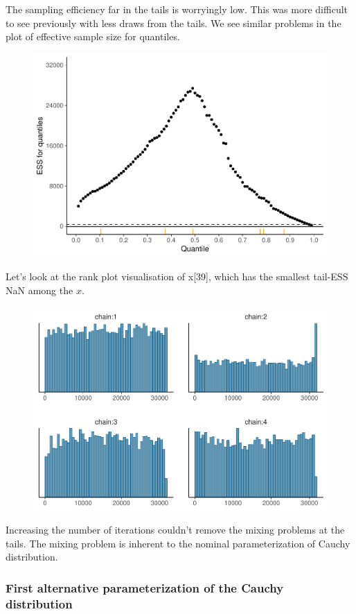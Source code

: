 \documentclass[american,]{article}
\begin{document}
The sampling efficiency far in the tails is worryingly low. This was
more difficult to see previously with less draws from the tails. We see
similar problems in the plot of effective sample size for quantiles.

\begin{figure}[t]
  \centering
  \includegraphics[width=0.6\linewidth]{graphics/quantile-ess-fit-nom-td20l-finer-1.pdf}
\end{figure}

Let's look at the rank plot visualisation of x{[}39{]}, which has the
smallest tail-ESS NaN among the \(x\).

\begin{figure}[t]
  \centering
  \includegraphics[width=0.6\linewidth]{graphics/hist-fit-nom-td20l-1.pdf}
\end{figure}

Increasing the number of iterations couldn't remove the mixing problems
at the tails. The mixing problem is inherent to the nominal
parameterization of Cauchy distribution.

\hypertarget{first-alternative-parameterization-of-the-cauchy-distribution}{%
\subsubsection*{First alternative parameterization of the Cauchy
distribution}\label{first-alternative-parameterization-of-the-cauchy-distribution}}
\end{document}
